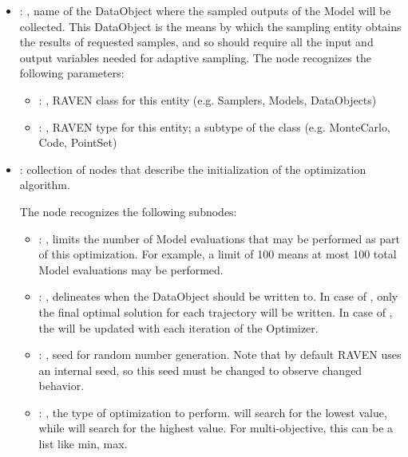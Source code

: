 \begin{itemize}
    \item {}: ,
      name of the DataObject where the sampled outputs of the Model will be collected.
      This DataObject is the means by which the sampling entity obtains the results of requested
      samples, and so should require all the input and output variables needed for adaptive
      sampling.
      The  node recognizes the following parameters:
        \begin{itemize}
          \item {}: ,
            RAVEN class for this entity (e.g. Samplers, Models, DataObjects)
          \item {}: ,
            RAVEN type for this entity; a subtype of the class (e.g. MonteCarlo, Code, PointSet)
      \end{itemize}

    \item {}:
      collection of nodes that describe the initialization of the optimization algorithm.

      The  node recognizes the following subnodes:
      \begin{itemize}
        \item {}: ,
          limits the number of Model evaluations that may be performed as part of this optimization.
          For example, a limit of 100 means at most 100 total Model evaluations may be performed.

        \item {}: ,
          delineates when the  DataObject should be written to. In case
          of , only the final optimal solution for each trajectory will be written.
          In case of , the  will be updated with each
          iteration               of the Optimizer.

        \item {}: ,
          seed for random number generation. Note that by default RAVEN uses an internal seed,
          so this seed must be changed to observe changed behavior. 

        \item {}: ,
          the type of optimization to perform.  will search for the lowest
           value, while  will search for the highest value.
          For multi-objective, this can be a list like min, max.


\end{itemize}
\end{itemize}
